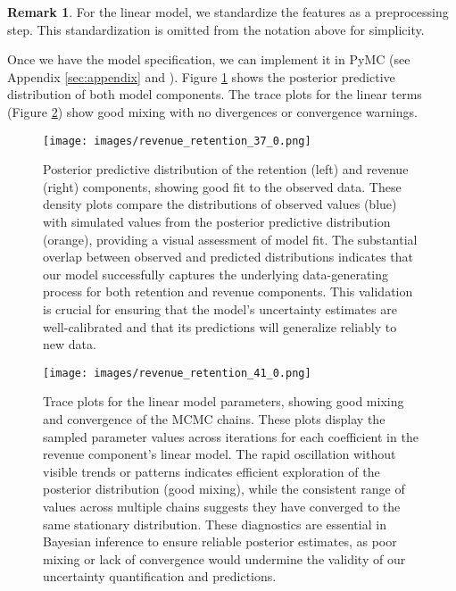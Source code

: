 \documentclass[11pt]{amsart}
\theoremstyle{definition}
\newtheorem{remark}{Remark}
\begin{document}
\begin{remark}
    For the linear model, we standardize the features as a preprocessing step. This standardization is omitted from the
    notation above for simplicity.
\end{remark}

Once we have the model specification, we can implement it in PyMC (see Appendix \ref{sec:appendix} and
\cite{orduz_revenue_retention}). Figure \ref{fig:posterior_predictive} shows the posterior predictive distribution of both
model components. The trace plots for the linear terms (Figure \ref{fig:trace}) show good mixing with no divergences or
convergence warnings.

\begin{figure}
    \centering
    \texttt{[image: images/revenue\_retention\_37\_0.png]}
    \caption{Posterior predictive distribution of the retention (left) and revenue (right) components, showing good fit to
        the observed data. These density plots compare the distributions of observed values (blue) with simulated values
        from the posterior predictive distribution (orange), providing a visual assessment of model fit. The substantial
        overlap between observed and predicted distributions indicates that our model successfully captures the
        underlying data-generating process for both retention and revenue components. This validation is crucial for
        ensuring that the model's uncertainty estimates are well-calibrated and that its predictions will generalize
        reliably to new data.}
    \label{fig:posterior_predictive}
\end{figure}

\begin{figure}
    \centering
    \texttt{[image: images/revenue\_retention\_41\_0.png]}
    \caption{Trace plots for the linear model parameters, showing good mixing and convergence of the MCMC chains. These
        plots display the sampled parameter values across iterations for each coefficient in the revenue component's
        linear model. The rapid oscillation without visible trends or patterns indicates efficient exploration of the
        posterior distribution (good mixing), while the consistent range of values across multiple chains suggests they
        have converged to the same stationary distribution. These diagnostics are essential in Bayesian inference to
        ensure reliable posterior estimates, as poor mixing or lack of convergence would undermine the validity of our
        uncertainty quantification and predictions.}
    \label{fig:trace}
\end{figure}
\end{document}
